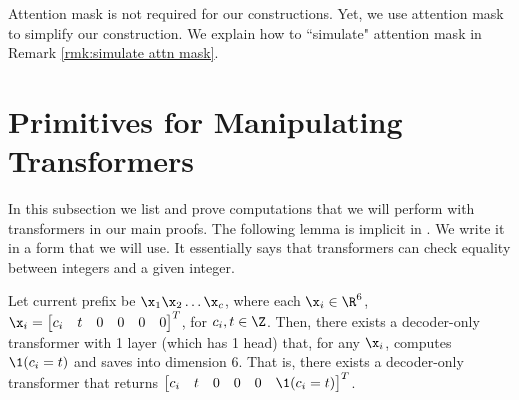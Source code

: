 \begin{remark}
    Attention mask is not required for our constructions. Yet, we use attention mask to simplify our construction. We explain how to ``simulate" attention mask in Remark \ref{rmk:simulate attn mask}.
\end{remark}

\section{Primitives for Manipulating Transformers}\label{sec:manipulate}


In this subsection we list and prove computations that we will perform with transformers in our main proofs. The following lemma is implicit in \cite{chiang2022overcoming}.  We write it in a form that we will use. 
It essentially says that transformers can check equality between integers and a given integer.

\begin{lemma} \label{lem:tran checks if c_i = t}
    Let current prefix be $\x_1 \x_2 \dots \x_c$, where each $\x_i \in \R^6$, $\x_i = \begin{bmatrix}c_i & t & 0 & 0 & 0 & 0\end{bmatrix}^T$, for $c_i, t \in \Z$. Then, there exists a decoder-only transformer with 1 layer (which has 1 head) that, for any $\x_i$, computes $\1(c_i = t)$ and saves into dimension $6$. That is, there exists a decoder-only transformer that returns $\begin{bmatrix}
        c_i &t &0 &0 &0 &\1(c_i = t)
    \end{bmatrix}^T$.    
\end{lemma}

